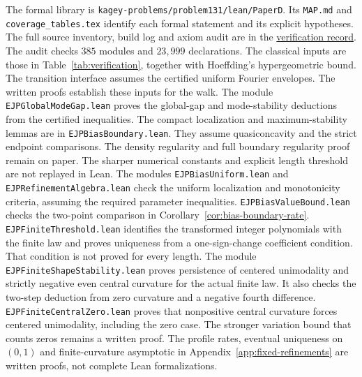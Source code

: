 The formal library is
\nolinkurl{kagey-problems/problem131/lean/PaperD}. Its
\nolinkurl{MAP.md} and \nolinkurl{coverage_tables.tex} identify each
formal statement and its explicit hypotheses. The full source inventory,
build log and axiom audit are in the
\href{https://github.com/apemm/Kagey-Problems/tree/paperD-ejp-v1/reports/paperD-ejp-2026-11-05}{verification record}.
The audit checks $385$ modules and $23{,}999$ declarations.
The classical inputs are those in Table~\ref{tab:verification}, together
with Hoeffding's hypergeometric bound. The transition interface assumes
the certified uniform Fourier envelopes. The written proofs establish
these inputs for the walk.
The module \nolinkurl{EJPGlobalModeGap.lean} proves the global-gap
and mode-stability deductions from the certified inequalities.
The compact localization and maximum-stability lemmas are in
\nolinkurl{EJPBiasBoundary.lean}. They assume quasiconcavity and the
strict endpoint comparisons. The density regularity and full boundary
regularity proof remain on paper. The sharper numerical constants
and explicit length threshold are not replayed in Lean.
The modules \nolinkurl{EJPBiasUniform.lean} and
\nolinkurl{EJPRefinementAlgebra.lean} check the uniform localization
and monotonicity criteria, assuming the required parameter inequalities.
\nolinkurl{EJPBiasValueBound.lean} checks the two-point comparison in
Corollary~\ref{cor:bias-boundary-rate}.
\nolinkurl{EJPFiniteThreshold.lean} identifies the transformed integer
polynomials with the finite law and proves uniqueness from a one-sign-change
coefficient condition. That condition is not proved for every length.
The module \nolinkurl{EJPFiniteShapeStability.lean} proves persistence of
centered unimodality and strictly negative even central curvature for
the actual finite law. It also checks the two-step deduction from zero
curvature and a negative fourth difference.
\nolinkurl{EJPFiniteCentralZero.lean} proves that nonpositive central
curvature forces centered unimodality, including the zero case.
The stronger variation bound
that counts zeros remains a written proof.
The profile rates, eventual uniqueness on $(0,1)$ and finite-curvature asymptotic in
Appendix~\ref{app:fixed-refinements} are written proofs, not complete
Lean formalizations.
